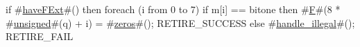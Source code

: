 if #\hyperref[sailRISCVzhaveFExt]{haveFExt}#() then {
  foreach (i from 0 to 7)
    if m[i] == bitone then
      #\hyperref[sailRISCVzF]{F}#(8 * #\hyperref[sailRISCVzunsigned]{unsigned}#(q) + i) = #\hyperref[sailRISCVzzzeros]{zeros}#();
  RETIRE_SUCCESS
} else {
  #\hyperref[sailRISCVzhandlezyillegal]{handle\_illegal}#();
  RETIRE_FAIL
}
